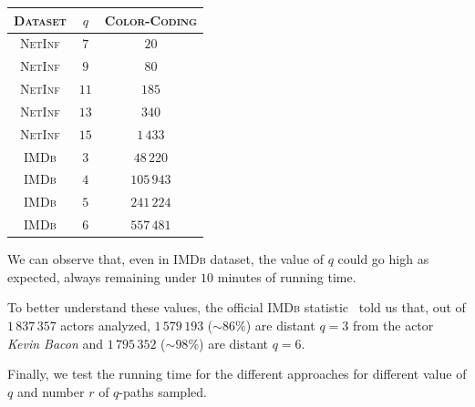 \begin{table}[h]
	\centering
	\begin{tabular}{|c|c|c|}
		\hline
		\textsc{Dataset} & $q$  & \textsc{Color-Coding} \\ \hline \hline
		\textsc{NetInf}  & $7$  & $20$                  \\ \hline
		\textsc{NetInf}  & $9$  & $80$                  \\ \hline
		\textsc{NetInf}  & $11$ & $185$                 \\ \hline
		\textsc{NetInf}  & $13$ & $340$                 \\ \hline
		\textsc{NetInf}  & $15$ & $1\,433$              \\ \hline \hline
		\textsc{IMDb}    & $3$  & $48\,220$             \\ \hline
		\textsc{IMDb}    & $4$  & $105\,943$            \\ \hline
		\textsc{IMDb}    & $5$  & $241\,224$            \\ \hline
		\textsc{IMDb}    & $6$  & $557\,481$            \\ \hline
	\end{tabular}
\end{table}

We can observe that, even in \textsc{IMDb} dataset, the value of $q$ could go high as expected, always remaining under $10$ minutes of running time. \medskip

To better understand these values, the official \textsc{IMDb} statistic~\cite{imdbstat} told us that, out of $1\,837\,357$ actors analyzed, $1\,579\,193$ ($\sim86\%$) are distant $q=3$ from the actor \textit{Kevin Bacon} and $1\,795\,352$ ($\sim98\%$) are distant $q=6$.\medskip

Finally, we test the running time for the different approaches for different value of $q$ and number $r$ of $q$-paths sampled. 

